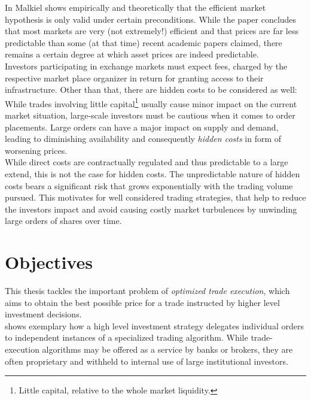 In \Cite{TheEfficentMarketHypothesisAndItsCritics} Malkiel shows empirically and theoretically that the efficient market hypothesis is only valid under certain preconditions. While the paper concludes that most markets are very (not extremely!) efficient and that prices are far less predictable than some (at that time) recent academic papers claimed, there remains a certain degree at which asset prices are indeed predictable.\\

Investors participating in exchange markets must expect fees, charged by the respective market place organizer in return for granting access to their infrastructure. Other than that, there are hidden costs to be considered as well: While trades involving little capital\footnote{Little capital, relative to the whole market liquidity.} usually cause minor impact on the current market situation, large-scale investors must be cautious when it comes to order placements. Large orders can have a major impact on supply and demand, leading to diminishing availability and consequently \emph{hidden costs} in form of worsening prices.\\

While direct costs are contractually regulated and thus predictable to a large extend, this is not the case for hidden costs. The unpredictable nature of hidden costs bears a significant risk that grows exponentially with the trading volume pursued. This motivates for well considered trading strategies, that help to reduce the investors impact and avoid causing costly market turbulences by unwinding large orders of shares over time.



\section{Objectives}
\label{chap:objectives}
This thesis tackles the important problem of \emph{optimized trade execution}, which aims to obtain the best possible price for a trade instructed by higher level investment decisions.\\

 shows exemplary how a high level investment strategy delegates individual orders to independent instances of a specialized trading algorithm. While trade-execution algorithms may be offered as a service by banks or brokers, they are often proprietary and withheld to internal use of large institutional investors.\\




